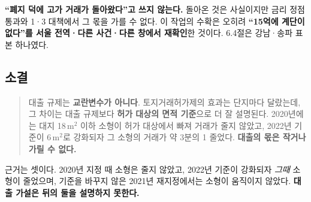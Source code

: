 \textbf{``폐지 덕에 고가 거래가 돌아왔다''고 쓰지 않는다.} 돌아온 것은 사실이지만
금리 정점 통과와 1·3 대책에서 그 몫을 가를 수 없다. 이 작업의 수확은 오히려
\textbf{``15억에 계단이 없다''를 서울 전역·다른 사건·다른 창에서 재확인}한 것이다.
6.4절은 강남·송파 표본 하나였다.

\subsection{소결}

\begin{quote}
대출 규제는 \textbf{교란변수가 아니다}. 토지거래허가제의 효과는 단지마다
달랐는데, 그 차이는 대출 규제보다 \textbf{허가 대상의 면적 기준}으로 더 잘
설명된다. 2020년에는 대지 18\,m$^2$ 이하 소형이 허가 대상에서 빠져 거래가 줄지
않았고, 2022년 기준이 6\,m$^2$로 강화되자 그 소형의 거래가 약 3분의 1 줄었다.
\textbf{대출의 몫은 작거나 가릴 수 없다.}
\end{quote}

근거는 셋이다. 2020년 지정 때 소형은 줄지 않았고, 2022년 기준이 강화되자
\emph{그때} 소형이 줄었으며, 기준을 바꾸지 않은 2021년 재지정에서는 소형이
움직이지 않았다. \textbf{대출 가설은 뒤의 둘을 설명하지 못한다.}
